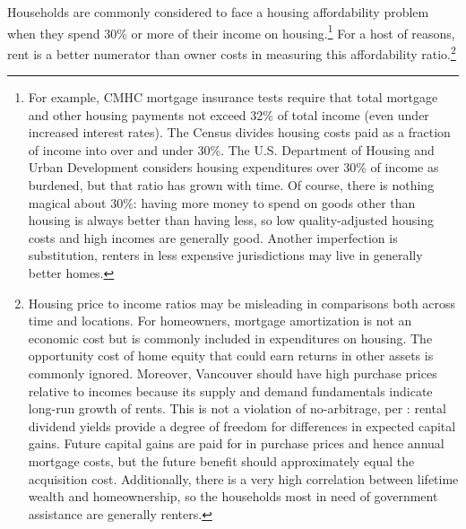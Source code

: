 \documentclass[12pt]{article}
\begin{document}
Households are commonly considered to face a housing affordability problem when they spend 30\% or more of their income on housing.\footnote{For example, CMHC mortgage insurance tests require that total mortgage and other housing payments not exceed 32\% of total income (even under increased interest rates). The Census divides housing costs paid as a fraction of income into over and under 30\%. The U.S. Department of Housing and Urban Development considers housing expenditures over 30\% of income as burdened, but that ratio has grown with time. Of course, there is nothing magical about 30\%: having more money to spend on goods other than housing is always better than having less, so low quality-adjusted housing costs and high incomes are generally good. Another imperfection is substitution, renters in less expensive jurisdictions may live in generally better homes.} For a host of reasons, rent is a better numerator than owner costs in measuring this affordability ratio.\footnote{Housing price to income ratios may be misleading in comparisons both across time and locations. For homeowners, mortgage amortization is not an economic cost but is commonly included in expenditures on housing. The opportunity cost of home equity that could earn returns in other assets is commonly ignored. Moreover, Vancouver should have high purchase prices relative to incomes because its supply and demand fundamentals indicate long-run growth of rents. This is not a violation of no-arbitrage, per \textcite{GyourkoMayerSinai}: rental dividend yields provide a degree of freedom for differences in expected capital gains. Future capital gains are paid for in purchase prices and hence annual mortgage costs, but the future benefit should approximately equal the acquisition cost.  Additionally, there is a very high correlation between lifetime wealth and homeownership, so the households most in need of government assistance are generally renters.}
\end{document}
